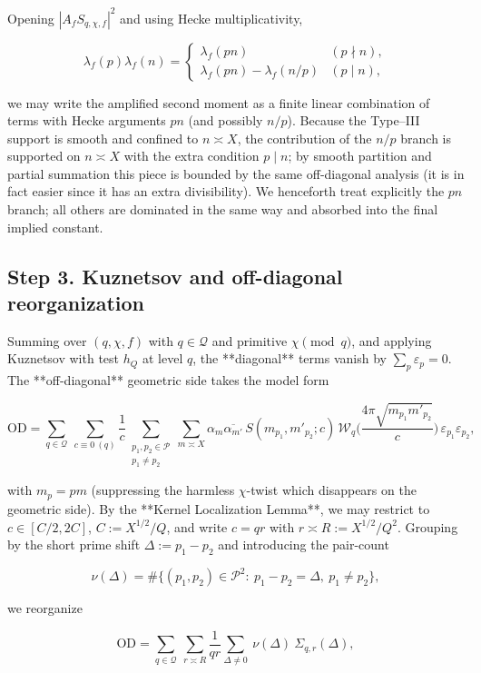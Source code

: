\documentclass[11pt]{article}
\theoremstyle{definition}
\theoremstyle{remark}
\begin{document}
Opening $|A_f S_{q,\chi,f}|^2$ and using Hecke multiplicativity,

$$
\lambda_f(p)\lambda_f(n)=
\begin{cases}
\lambda_f(pn) & (p\nmid n),\\
\lambda_f(pn)-\lambda_f(n/p) & (p\mid n),
\end{cases}
$$

we may write the amplified second moment as a finite linear combination of terms with Hecke arguments $pn$ (and possibly $n/p$). Because the Type–III support is smooth and confined to $n\asymp X$, the contribution of the $n/p$ branch is supported on $n\asymp X$ with the extra condition $p\mid n$; by smooth partition and partial summation this piece is bounded by the same off-diagonal analysis (it is in fact easier since it has an extra divisibility). We henceforth treat explicitly the $pn$ branch; all others are dominated in the same way and absorbed into the final implied constant.

\subsection*{Step 3. Kuznetsov and off-diagonal reorganization}

Summing over $(q,\chi,f)$ with $q\in\mathcal Q$ and primitive $\chi\pmod q$, and applying Kuznetsov with test $h_Q$ at level $q$, the **diagonal** terms vanish by $\sum_p\varepsilon_p=0$. The **off-diagonal** geometric side takes the model form

$$
\mathrm{OD}
=\sum_{q\in\mathcal Q}\ \sum_{c\equiv 0\ (q)} \frac{1}{c}\!
\sum_{\substack{p_1,p_2\in\mathcal P\\ p_1\ne p_2}}\!
\sum_{m\asymp X} \alpha_m\overline{\alpha_{m'}}\,
S(m_{p_1},m'_{p_2};c)\,
\mathcal W_q\!\Big(\frac{4\pi\sqrt{m_{p_1}m'_{p_2}}}{c}\Big)\,
\varepsilon_{p_1}\varepsilon_{p_2},
$$

with $m_{p}=pm$ (suppressing the harmless $\chi$-twist which disappears on the geometric side). By the **Kernel Localization Lemma**, we may restrict to $c\in[C/2,2C]$, $C:=X^{1/2}/Q$, and write $c=qr$ with $r\asymp R:=X^{1/2}/Q^2$. Grouping by the short prime shift $\Delta:=p_1-p_2$ and introducing the pair-count

$$
\nu(\Delta)=\#\{(p_1,p_2)\in\mathcal P^2:\ p_1-p_2=\Delta,\ p_1\ne p_2\},
$$

we reorganize

$$
\mathrm{OD}
=\sum_{q\in\mathcal Q}\ \sum_{r\asymp R} \frac{1}{qr}
\sum_{\Delta\ne 0}\ \nu(\Delta)\ \Sigma_{q,r}(\Delta),
$$
\end{document}
